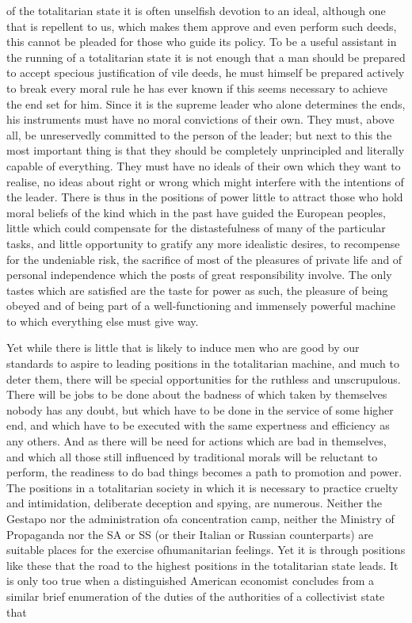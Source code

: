 \documentclass[11pt,openany]{book}
\begin{document}
of the totalitarian state it is often unselfish devotion to an ideal, although one that is repellent to us, which makes them approve and even perform such deeds, this cannot be pleaded for those who guide its policy. To be a useful assistant in the running of a totalitarian state it is not enough that a man should be prepared to accept specious justification of vile deeds, he must himself be prepared actively to break every moral rule he has ever known if this seems necessary to achieve the end set for him. Since it is the supreme leader who alone determines the ends, his instruments must have no moral convictions of their own. They must, above all, be unreservedly committed to the person of the leader; but next to this the most important thing is that they should be completely unprincipled and literally capable of everything. They must have no ideals of their own which they want to realise, no ideas about right or wrong which might interfere with the intentions of the leader. There is thus in the positions of power little to attract those who hold moral beliefs of the kind which in the past have guided the European peoples, little which could compensate for the distastefulness of many of the particular tasks, and little opportunity to gratify any more idealistic desires, to recompense for the undeniable risk, the sacrifice of most of the pleasures of private life and of personal independence which the posts of great responsibility involve. The only tastes which are satisfied are the taste for power as such, the pleasure of being obeyed and of being part of a well-functioning and immensely powerful machine to which everything else must give way.

Yet while there is little that is likely to induce men who are good by our standards to aspire to leading positions in the totalitarian machine, and much to deter them, there will be special opportunities for the ruthless and unscrupulous. There will be jobs to be done about the badness of which taken by themselves nobody has any doubt, but which have to be done in the service of some higher end, and which have to be executed with the same expertness and efficiency as any others. And as there will be need for actions which are bad in themselves, and which all those still influenced by traditional morals will be reluctant to perform, the readiness to do bad things becomes a path to promotion and power. The positions in a totalitarian society in which it is necessary to practice cruelty and intimidation, deliberate deception and spying, are numerous. Neither the Gestapo nor the administration ofa concentration camp, neither the Ministry of Propaganda nor the SA or SS (or their Italian or Russian counterparts) are suitable places for the exercise ofhumanitarian feelings. Yet it is through positions like these that the road to the highest positions in the totalitarian state leads. It is only too true when a distinguished American economist concludes from a similar brief enumeration of the duties of the authorities of a collectivist state that
\end{document}
